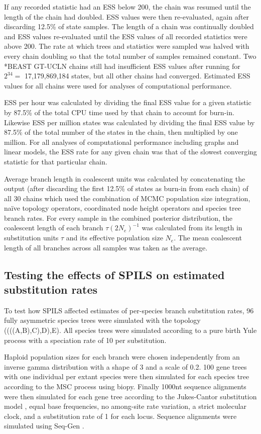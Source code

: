\documentclass[12pt]{article}
\begin{document}
If any recorded statistic had an ESS below 200, the chain was resumed until
the length of the chain had doubled. ESS values were then re-evaluated, again
after discarding 12.5\% of state samples. The length of a chain was
continually doubled and ESS values re-evaluated until the ESS values of all
recorded statistics were above 200. The rate at which trees and statistics
were sampled was halved with every chain doubling so that the total number of
samples remained constant. Two *BEAST GT-UCLN chains still had insufficient
ESS values after running for $2^{34} =$ 17,179,869,184 states, but all other
chains had converged. Estimated ESS values for all chains were used for
analyses of computational performance.

ESS per hour was calculated by dividing the final ESS value for a given
statistic by 87.5\% of the total CPU time used by that chain to account for
burn-in. Likewise ESS per million states was calculated by dividing the final
ESS value by 87.5\% of the total number of the states in the chain, then
multiplied by one million. For all analyses of computational performance
including graphs and linear models, the ESS rate for any given chain was that
of the slowest converging statistic for that particular chain.

Average branch length in coalescent units was calculated by concatenating the
output (after discarding the first 12.5\% of states as burn-in from each
chain) of all 30 chains which used the combination of MCMC population size
integration, na\"ive topology operators, coordinated node height operators and
species tree branch rates. For every sample in the combined posterior
distribution, the coalescent length of each branch $\tau(2N_e)^{-1}$ was
calculated from its length in substitution units $\tau$ and its effective
population size $N_e$. The mean coalescent length of all branches across all
samples was taken as the average.

\subsection{Testing the effects of SPILS on estimated substitution rates}

To test how SPILS affected estimates of per-species branch substitution rates,
96 fully asymmetric species trees were simulated with the topology
((((A,B),C),D),E). All species trees were simulated according to a pure birth Yule
process \citep{Yule21} with a speciation rate of 10 per substitution.

Haploid population sizes for each branch were chosen independently from an
inverse gamma distribution with a shape of 3 and a scale of 0.2. 100 gene trees
with one individual per extant species were then simulated for each species tree
according to the MSC process using biopy. Finally 1000nt sequence alignments
were then simulated for each gene tree according to the Jukes-Cantor
substitution model \citep{JUKES196921}, equal base frequencies, no among-site
rate variation, a strict molecular clock, and a substitution rate of 1 for each
locus. Sequence alignments were simulated using Seq-Gen \citep{Rambaut01061997}.
\end{document}
